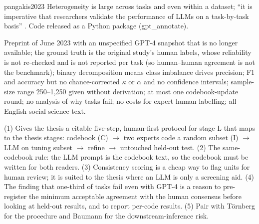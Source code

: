 \begin{papercard}{pangakis2023}
 Heterogeneity is large across tasks and even within a dataset; ``it is imperative that researchers validate the performance of LLMs on a task-by-task basis'' . Code released as a Python package (gpt\_annotate).

 Preprint of June 2023 with an unspecified GPT-4 snapshot that is no longer available; the ground truth is the original study's human labels, whose reliability is not re-checked and is not reported per task (so human--human agreement is not the benchmark); binary decomposition means class imbalance drives precision; F1 and accuracy but no chance-corrected $\kappa$ or $\alpha$ and no confidence intervals; sample-size range 250--1,250 given without derivation; at most one codebook-update round; no analysis of why tasks fail; no costs for expert human labelling; all English social-science text.

 (1) Gives the thesis a citable five-step, human-first protocol for stage L that maps to the thesis stages: codebook (C) $\to$ two experts code a random subset (I) $\to$ LLM on tuning subset $\to$ refine $\to$ untouched held-out test. (2) The same-codebook rule: the LLM prompt is the codebook text, so the codebook must be written for both readers. (3) Consistency scoring is a cheap way to flag units for human review; it is suited to the thesis where an LLM is only a screening aid. (4) The finding that one-third of tasks fail even with GPT-4 is a reason to pre-register the minimum acceptable agreement with the human consensus before looking at held-out results, and to report per-code results. (5) Pair with Törnberg for the procedure and Baumann for the downstream-inference risk.
\end{papercard}
